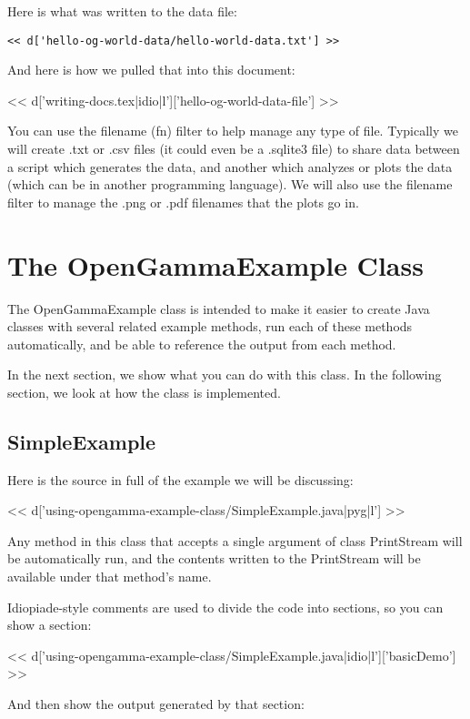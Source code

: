 Here is what was written to the data file:

\begin{Verbatim}
<< d['hello-og-world-data/hello-world-data.txt'] >>
\end{Verbatim}

And here is how we pulled that into this document:

<< d['writing-docs.tex|idio|l']['hello-og-world-data-file'] >>

You can use the filename (fn) filter to help manage any type of file. Typically
we will create .txt or .csv files (it could even be a .sqlite3 file) to share
data between a script which generates the data, and another which analyzes or
plots the data (which can be in another programming language). We will also use
the filename filter to manage the .png or .pdf filenames that the plots go in.

\section{The OpenGammaExample Class}

The OpenGammaExample class is intended to make it easier to create Java classes
with several related example methods, run each of these methods automatically,
and be able to reference the output from each method.

In the next section, we show what you can do with this class. In the following
section, we look at how the class is implemented.

\subsection{SimpleExample}

Here is the source in full of the example we will be discussing:

<< d['using-opengamma-example-class/SimpleExample.java|pyg|l'] >>

Any method in this class that accepts a single argument of class PrintStream
will be automatically run, and the contents written to the PrintStream will be
available under that method's name.

Idiopiade-style comments are used to divide the code into sections, so
you can show a section:

<< d['using-opengamma-example-class/SimpleExample.java|idio|l']['basicDemo'] >>

And then show the output generated by that section:

